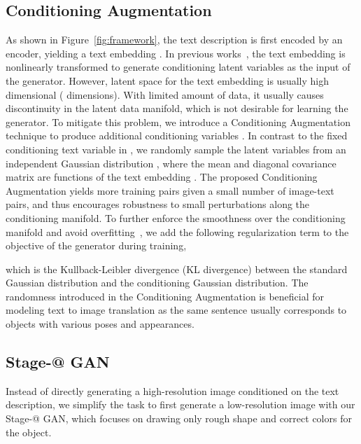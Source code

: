 \documentclass[10pt,twocolumn,letterpaper]{article}
\makeatletter
\newcommand{\Rmnum}[1]{\expandafter\@slowromancap\romannumeral #1@}
\makeatother
\begin{document}
\subsection{Conditioning Augmentation}
\vspace{-5pt}
As shown in Figure~\ref{fig:framework}, the text description  is first encoded by an encoder, yielding a text embedding . In previous works~\cite{reed2016generative,reed2016learning}, the text embedding is nonlinearly transformed to generate conditioning latent variables as the input of the generator. However, latent space for the text embedding is usually high dimensional ( dimensions). With limited amount of data, it usually causes discontinuity in the latent data manifold, which is not desirable for learning the generator. To mitigate this problem, we introduce a Conditioning Augmentation technique to produce additional conditioning variables . In contrast to the fixed conditioning text variable  in \cite{reed2016generative,reed2016learning}, we randomly sample the latent variables  from an independent Gaussian distribution , where the mean  and diagonal covariance matrix  are functions of the text embedding . The proposed Conditioning Augmentation yields more training pairs given a small number of image-text pairs, and thus encourages robustness to small perturbations along the conditioning manifold. To further enforce the smoothness over the conditioning manifold and avoid overfitting~\cite{Doersch16, LarsenSLW16}, we add the following regularization term to the objective of the generator during training, 

which is the Kullback-Leibler divergence (KL divergence) between the standard Gaussian distribution and the conditioning Gaussian distribution. 
The randomness introduced in the Conditioning Augmentation is beneficial for modeling text to image translation as the same sentence usually corresponds to objects with various poses and appearances. 



\subsection{Stage-\Rmnum{1} GAN}
\vspace{-5pt}

Instead of directly generating a high-resolution image conditioned on the text description, we simplify the task to first generate a low-resolution image with our Stage-\Rmnum{1} GAN, which focuses on drawing only rough shape and correct colors for the object. 
\end{document}
